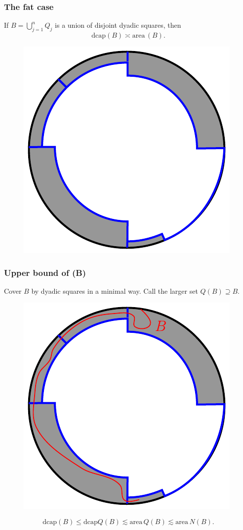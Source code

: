 \documentclass[xcolor=pdftex,dvipsnames,table]{beamer}
\newcommand{\area}{\text{area}\,}
\newcommand{\dcap}{\text{dcap}}
\theoremstyle{definition}
\begin{document}
\begin{frame}
  \frametitle{The fat case}
  \begin{lemma}
    If $B = \bigcup_{j=1}^n Q_j$ is a union of disjoint dyadic squares, then
    \[
        \dcap(B) \asymp \area(B).
    \]
  \end{lemma}
  \begin{figure}
    \includegraphics[scale=0.6]{figures/fatCase.pdf}
  \end{figure}
\end{frame}

\begin{frame}
  \frametitle{Upper bound of \dcap(B)}
  Cover $B$ by dyadic squares in a minimal way. Call the larger set $Q(B) \supseteq B$.
  \begin{figure}
      \includegraphics[scale=0.6]{figures/Q(B).pdf}
  \end{figure}
  \[
      \dcap(B) \leq \dcap Q(B) \lesssim \area Q(B) \lesssim \area N(B).
  \]
\end{frame}
\end{document}

